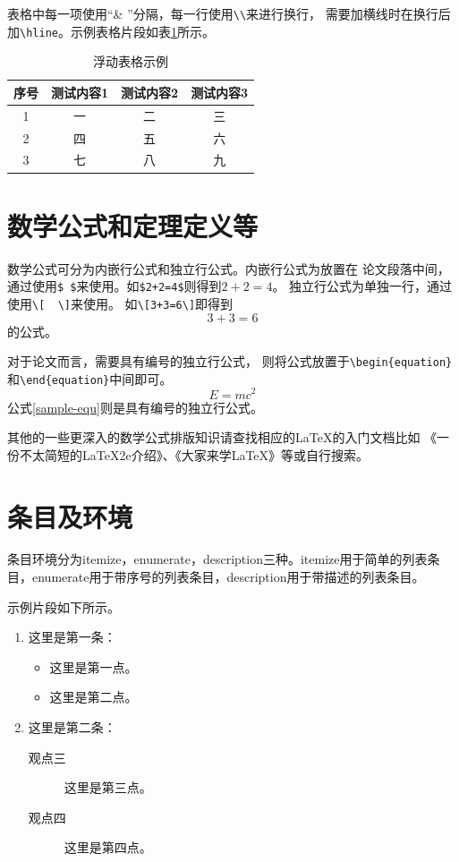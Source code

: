 表格中每一项使用“\& ”分隔，每一行使用\verb|\\|来进行换行，
需要加横线时在换行后加\verb|\hline|。示例表格片段如表\ref{tab-test3}所示。
\begin{table}
\begin{center}
\caption{浮动表格示例\label{tab-test3}}
\begin{tabular}{c||c|c|c}
\hline
序号&测试内容1&测试内容2&测试内容3\\
\hline \hline
1 & 一 & 二 & 三\\\hline
2 & 四 & 五 & 六\\\hline
3 & 七 & 八 & 九\\\hline
\end{tabular}
\end{center}
\end{table}

\section{数学公式和定理定义等}
\label{sec-math}
数学公式可分为内嵌行公式和独立行公式。内嵌行公式为放置在
论文段落中间，通过使用\verb|$ $|来使用。如\verb|$2+2=4$|则得到$2+2=4$。
独立行公式为单独一行，通过使用\verb|\[  \]|来使用。
如\verb|\[3+3=6\]|即得到\[3+3=6\]的公式。

对于论文而言，需要{\heiti 具有编号}的独立行公式，
则将公式放置于\verb|\begin{equation}|和\verb|\end{equation}|中间即可。
\begin{equation}
\label{sample-equ}
E=mc^2
\end{equation}
公式\ref{sample-equ}则是具有编号的独立行公式。

其他的一些更深入的数学公式排版知识请查找相应的\LaTeX{}的入门文档比如
《一份不太简短的\LaTeX2e{}介绍》、《大家来学\LaTeX{}》等或自行搜索。

\section{条目及环境}
\label{sec-item}
条目环境分为itemize，enumerate，description三种。itemize用于简单的列表条目，enumerate用于带序号的列表条目，description用于带描述的列表条目。

示例片段如下所示。
\begin{enumerate}
    \item 这里是第一条：
        \begin{itemize}
            \item 这里是第一点。
            \item 这里是第二点。
        \end{itemize}
    \item 这里是第二条：
        \begin{description}
            \item[观点三] 这里是第三点。
            \item[观点四] 这里是第四点。
        \end{description}
\end{enumerate}


